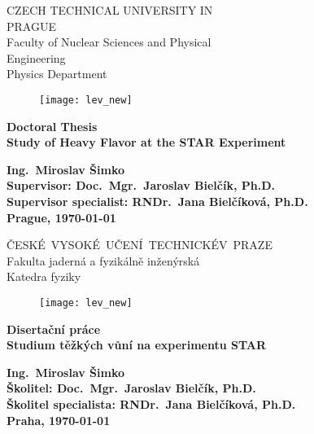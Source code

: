 \documentclass[a4paper,titlepage,11pt,twoside,openright]{report} %
\newcommand{\myself}{Ing.\ Miroslav Šimko}
\newcommand{\engtitle}{Study of Heavy Flavor at the STAR Experiment}
\newcommand{\czechtitle}{Studium těžkých vůní na experimentu STAR}
\newcommand{\skolitel}{Doc.\ Mgr.\ Jaroslav Bielčík, Ph.D.}
\newcommand{\konzultant}{RNDr.\ Jana Bielčíková, Ph.D.}
\begin{document}
\thispagestyle{empty}
\setcounter{page}{1}
\begin{center}
    {\LARGE \textsc CZECH TECHNICAL UNIVERSITY IN \\[0.3cm]PRAGUE}\\[2ex]
    {\LARGE \textsc Faculty of Nuclear Sciences and Physical \\[0.2cm]Engineering}\\[2ex]
    {\LARGE \textsc Physics Department}\\
    \vspace{1cm}
    \begin{figure}[ht!]
    \begin{center}
      {\texttt{[image: lev\_new]}}
    \end{center}
    \end{figure}
    \vspace{1cm}

    {\textbf {\Huge Doctoral Thesis \\[4ex]}
    {\LARGE \bf \engtitle} 
    }

    \vfill

    {\Large \bf \myself }\\ [4ex]
    {\large \bf  Supervisor: \skolitel}\\
    {\large \bf  Supervisor specialist: \konzultant}\\[4ex]
    {\Large \bf Prague, \justyear\today}\\
    \newpage \rule{0pt}{2cm}
\end{center}
\thispagestyle{empty}
\begin{center}
    {\LARGE \textsc \mbox{\v{C}ESK\' E VYSOKÉ U\v CEN\' I TECHNICK\' E \\[0.3cm]V PRAZE}}\\[2ex]
    {\LARGE \textsc Fakulta jadern\' a a fyzik\' aln\v e in\v zen\' yrsk\' a}\\[2ex]
    {\LARGE \textsc Katedra fyziky}\\
    \vspace{1cm}
    \begin{figure}[ht!]
    \begin{center}
      {\texttt{[image: lev\_new]}}
    \end{center}
    \end{figure}
    \vspace{1cm}

    {\textbf {\Huge Disertační práce \\[4ex]}
    {\LARGE \bf \czechtitle} 
    }

    \vfill

    {\Large \bf \myself }\\ [4ex]
    {\large \bf Školitel: \skolitel}\\
    {\large \bf Školitel specialista: \konzultant}\\[4ex]
    {\Large \bf Praha, \justyear\today}\\
    \newpage \rule{0pt}{2cm}
\end{center}
\end{document}
